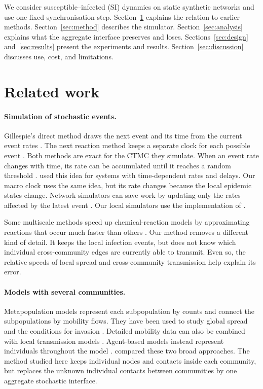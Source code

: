 \documentclass[a4paper,fleqn]{cas-sc}
\begin{document}
We consider susceptible--infected (SI) dynamics on static synthetic networks and use one fixed synchronisation step. Section~\ref{sec:related} explains the relation to earlier methods. Section~\ref{sec:method} describes the simulator. Section~\ref{sec:analysis} explains what the aggregate interface preserves and loses. Sections~\ref{sec:design} and~\ref{sec:results} present the experiments and results. Section~\ref{sec:discussion} discusses use, cost, and limitations.

\clearpage

\section{Related work}
\label{sec:related}

\paragraph{Simulation of stochastic events.}
Gillespie's direct method draws the next event and its time from the current event rates \citep{gillespie1977exact}. The next reaction method keeps a separate clock for each possible event \citep{gibson2000}. Both methods are exact for the CTMC they simulate. When an event rate changes with time, its rate can be accumulated until it reaches a random threshold \citep{ethier1986}. \citet{anderson2007} used this idea for systems with time-dependent rates and delays. Our macro clock uses the same idea, but its rate changes because the local epidemic states change. Network simulators can save work by updating only the rates affected by the latest event \citep{vestergaard2015,kuryliak2025simulating}. Our local simulators use the implementation of \citet{kuryliak2025simulating}.

Some multiscale methods speed up chemical-reaction models by approximating reactions that occur much faster than others \citep{haseltine2002,cao2005slow}. Our method removes a different kind of detail. It keeps the local infection events, but does not know which individual cross-community edges are currently able to transmit. Even so, the relative speeds of local spread and cross-community transmission help explain its error.

\paragraph{Models with several communities.}
Metapopulation models represent each subpopulation by counts and connect the subpopulations by mobility flows. They have been used to study global spread and the conditions for invasion \citep{colizza2007reaction,colizza2008,balcan2009,balcan2010modeling}. Detailed mobility data can also be combined with local transmission models \citep{chang2021}. Agent-based models instead represent individuals throughout the model \citep{eubank2004,kerr2021}. \citet{ajelli2010} compared these two broad approaches. The method studied here keeps individual nodes and contacts inside each community, but replaces the unknown individual contacts between communities by one aggregate stochastic interface.
\end{document}
